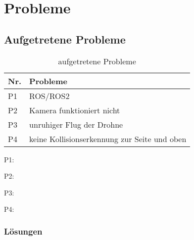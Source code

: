 \chapter{Probleme}

\section{Aufgetretene Probleme}


\begin{table}[H]
    \centering    
    \begin{tabular}{|p{1cm}|p{11cm}|}
        \hline
        Nr. & Probleme\\
        \hline
        P1 & ROS/ROS2 \\ \hline
        P2 & Kamera funktioniert nicht\\ \hline
        P3 & unruhiger Flug der Drohne \\ \hline
        P4 & keine Kollisionserkennung zur Seite und oben \\ \hline
    
    \end{tabular}
    \caption[aufgetretene Probleme]{\label{tab:probleme}aufgetretene Probleme}
    \end{table}
    

    P1:


    P2:


    P3:


    P4:

\subsection{Lösungen}

